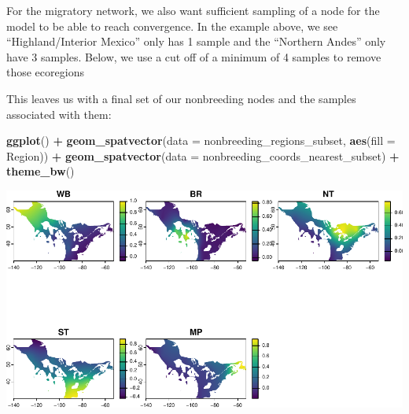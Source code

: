 \documentclass[
]{book}
\newenvironment{Shaded}{\begin{snugshade}}{\end{snugshade}}
\newcommand{\AttributeTok}[1]{\textcolor[rgb]{0.13,0.29,0.53}{#1}}
\newcommand{\DecValTok}[1]{\textcolor[rgb]{0.00,0.00,0.81}{#1}}
\newcommand{\FunctionTok}[1]{\textcolor[rgb]{0.13,0.29,0.53}{\textbf{#1}}}
\newcommand{\NormalTok}[1]{#1}
\newcommand{\OtherTok}[1]{\textcolor[rgb]{0.56,0.35,0.01}{#1}}
\newcommand{\SpecialCharTok}[1]{\textcolor[rgb]{0.81,0.36,0.00}{\textbf{#1}}}
\begin{document}
For the migratory network, we also want sufficient sampling of a node for the model to be able to reach convergence. In the example above, we see ``Highland/Interior Mexico'' only has 1 sample and the ``Northern Andes'' only have 3 samples. Below, we use a cut off of a minimum of 4 samples to remove those ecoregions

\begin{Shaded}
\end{Shaded}

This leaves us with a final set of our nonbreeding nodes and the samples associated with them:

\begin{Shaded}
\begin{Highlighting}[]
\FunctionTok{ggplot}\NormalTok{() }\SpecialCharTok{+}
  \FunctionTok{geom\_spatvector}\NormalTok{(}\AttributeTok{data =}\NormalTok{ nonbreeding\_regions\_subset, }\FunctionTok{aes}\NormalTok{(}\AttributeTok{fill =}\NormalTok{ Region)) }\SpecialCharTok{+}
  \FunctionTok{geom\_spatvector}\NormalTok{(}\AttributeTok{data =}\NormalTok{ nonbreeding\_coords\_nearest\_subset) }\SpecialCharTok{+}
  \FunctionTok{theme\_bw}\NormalTok{()}
\end{Highlighting}
\end{Shaded}

\includegraphics{Mignette_files/figure-latex/unnamed-chunk-15-1.pdf}
\end{document}
